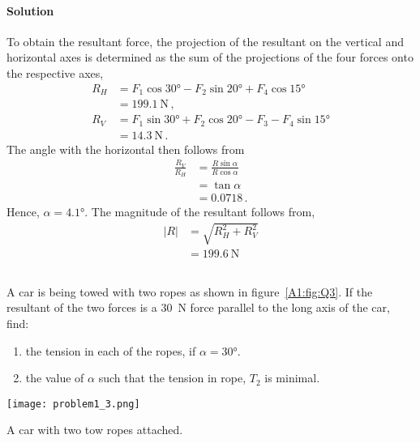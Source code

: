 \documentclass[a4paper,justified,oneside]{tufte-handout}
\numberwithin{equation}{subsection}
\begin{document}
\begin{solution}
\paragraph{Solution}
To obtain the resultant force, the projection of the resultant on the vertical and horizontal axes is determined as the sum of the projections of the four forces onto the respective axes,
\begin{align*}
	R_H	&=	F_1 \cos\ang{30} - F_2\sin\ang{20} + F_4 \cos\ang{15}\\
		&=	\SI{199.1}{\N}	\,,\\
	R_V	&=	F_1 \sin\ang{30} +F_2 \cos\ang{20}-F_3 -F_4\sin\ang{15}\\
		&=	\SI{14.3}{\N} \, .
\end{align*}
The angle with the horizontal then follows from
\begin{align*}
	\frac{R_V}{R_H}	&=	\frac{R\sin\alpha}{R\cos\alpha}\\
					&=	\tan\alpha \\
					&=0.0718\, .
\end{align*}
Hence, $\alpha=\ang{4.1}$. The magnitude of the resultant follows from,
\begin{align*}
	|R|	&=\sqrt{R_H^2+R_V^2}\\
			&=	\SI{199.6}{\N}
\end{align*}
\clearpage
\end{solution}

\subsection{}\label{A1:sec:towRope}
A car is being towed with two ropes as shown in figure~\ref{A1:fig:Q3}. If the resultant of the two forces is a \SI{30}{\N} force parallel to the long axis of the car, find:
\begin{enumerate}
	\item the tension in each of the ropes, if $\alpha = \ang{30}$.
	\item the value of $\alpha$ such that the tension in rope, $T_2$ is minimal.
\end{enumerate}
\begin{marginfigure}[-20mm]
	\centering
	\texttt{[image: problem1\_3.png]}
	\caption{A car with two tow ropes attached.}
	\label{A1:fig:Q3}
\end{marginfigure}
\end{document}
